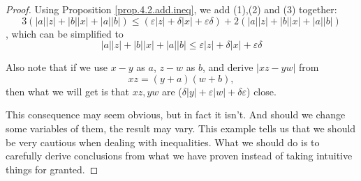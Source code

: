 \begin{proof}
Using Proposition \ref{prop.4.2.add.ineq}, we add (1),(2) and (3) together:
\[
3(|a||z| + |b||x| + |a||b|) \leq (\varepsilon|z| + \delta|x| + \varepsilon\delta) + 2(|a||z| + |b||x| + |a||b|)
\],
which can be simplified to
\[
|a||z| + |b||x| + |a||b| \leq \varepsilon|z| + \delta|x| + \varepsilon\delta
\]

Also note that if we use $x-y$ as $a$, $z-w$ as $b$, and derive $|xz-yw|$ from 
\[
xz=(y+a)(w+b),
\]
then what we will get is that $xz,yw$ are ($\delta|y| + \varepsilon|w| + \delta\varepsilon$) close.

This consequence may seem obvious, but in fact it isn't. And should we change some variables of them, the 
result may vary. This example tells us that we should be very cautious when dealing with inequalities. What we 
should do is to carefully derive conclusions from what we have proven instead of taking intuitive things for 
granted.
\end{proof}

